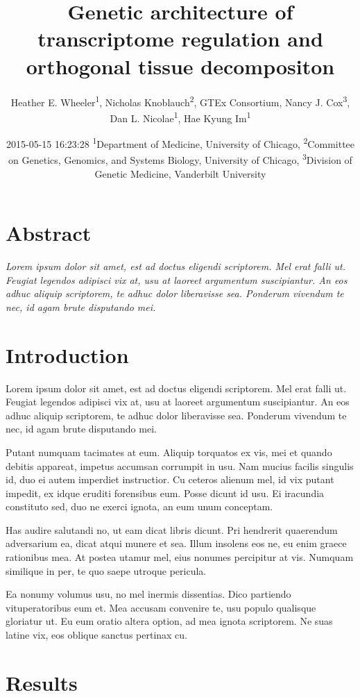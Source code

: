 \documentclass[]{article}
\title{Genetic architecture of transcriptome regulation and orthogonal tissue
decompositon}
\author{Heather E. Wheeler\textsuperscript{1}, Nicholas
Knoblauch\textsuperscript{2}, GTEx Consortium, Nancy J.
Cox\textsuperscript{3}, Dan L. Nicolae\textsuperscript{1}, Hae Kyung
Im\textsuperscript{1}}
\date{2015-05-15 16:23:28 \textsuperscript{1}Department of Medicine,
University of Chicago, \textsuperscript{2}Committee on Genetics,
Genomics, and Systems Biology, University of Chicago,
\textsuperscript{3}Division of Genetic Medicine, Vanderbilt University}
\begin{document}
\maketitle


\section{Abstract}\label{abstract}

\emph{Lorem ipsum dolor sit amet, est ad doctus eligendi scriptorem. Mel
erat falli ut. Feugiat legendos adipisci vix at, usu at laoreet
argumentum suscipiantur. An eos adhuc aliquip scriptorem, te adhuc dolor
liberavisse sea. Ponderum vivendum te nec, id agam brute disputando
mei.}

\section{Introduction}\label{introduction}

Lorem ipsum dolor sit amet, est ad doctus eligendi scriptorem. Mel erat
falli ut. Feugiat legendos adipisci vix at, usu at laoreet argumentum
suscipiantur. An eos adhuc aliquip scriptorem, te adhuc dolor
liberavisse sea. Ponderum vivendum te nec, id agam brute disputando mei.

Putant numquam tacimates at eum. Aliquip torquatos ex vis, mei et quando
debitis appareat, impetus accumsan corrumpit in usu. Nam mucius facilis
singulis id, duo ei autem imperdiet instructior. Cu ceteros alienum mel,
id vix putant impedit, ex idque eruditi forensibus eum. Posse dicunt id
usu. Ei iracundia constituto sed, duo ne exerci ignota, an eum unum
conceptam.

Has audire salutandi no, ut eam dicat libris dicunt. Pri hendrerit
quaerendum adversarium ea, dicat atqui munere et sea. Illum insolens eos
ne, eu enim graece rationibus mea. At postea utamur mel, eius nonumes
percipitur at vis. Numquam similique in per, te quo saepe utroque
pericula.

Ea nonumy volumus usu, no mel inermis dissentias. Dico partiendo
vituperatoribus eum et. Mea accusam convenire te, usu populo qualisque
gloriatur ut. Eu eum oratio altera option, ad mea ignota scriptorem. Ne
suas latine vix, eos oblique sanctus pertinax cu.

\section{Results}\label{results}
\end{document}
